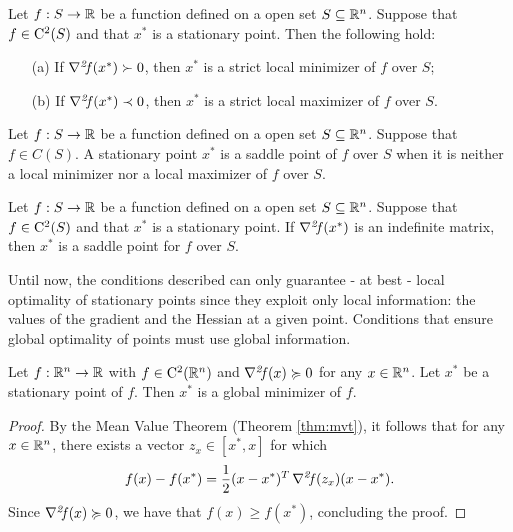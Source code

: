 \documentclass[10pt,a4paper]{article}
\begin{document}
\begin{theorem}\label{thm:suff_second_order_optimality}
	Let $f:S\to \mathbb{R}$ be a function defined on a open set $S\subseteq \mathbb{R}^n$. Suppose that $f\in\mathord{\mathrm{C^2}}(S)$ and that $x^*$ is a stationary point. Then the following hold:
	\begin{itemize}
		\item[(a)] If $\operatorname*{\mathit{\nabla^2 \!f}} (x^*)\succ 0$, then $x^*$ is a strict local minimizer of $f$ over $S$;
		\item[(b)] If  $\operatorname*{\mathit{\nabla^2 \!f}} (x^*)\prec 0$, then $x^*$ is a strict local maximizer of $f$ over $S$.
	\end{itemize}
\end{theorem}

\begin{definition}
	Let $f:S\to \mathbb{R}$ be a function defined on a open set $S\subseteq \mathbb{R}^n$. Suppose that $f\in C(S)$. A stationary point $x^*$ is a saddle point of $f$ over $S$ when it is neither a local minimizer nor a local maximizer of $f$ over $S$.
\end{definition}

\begin{theorem}
	Let $f:S\to \mathbb{R}$ be a function defined on a open set $S\subseteq \mathbb{R}^n$. Suppose that $f\in\mathord{\mathrm{C^2}}(S)$ and that $x^*$ is a stationary point. If $\operatorname*{\mathit{\nabla^2 \!f}}(x^*)$ is an indefinite matrix, then $x^*$ is a saddle point for $f$ over $S$.
\end{theorem}
Until now, the conditions described can only guarantee - at best - local optimality of stationary points since they exploit only local information: the values of the gradient and the Hessian at a given point. Conditions that ensure global optimality of points must use global information.

\begin{theorem}
	Let $f:\mathbb{R}^n\to \mathbb{R}$ with $f\in\mathord{\mathrm{C^2}}(\mathbb{R}^n)$ and $\operatorname*{\mathit{\nabla^2 \!f}} (x)\succcurlyeq0$ for any $x\in \mathbb{R}^n$. Let $x^*$ be a stationary point of $f$. Then $x^*$ is a global minimizer of $f$. 
\end{theorem}
\begin{proof}
	By the Mean Value Theorem (Theorem \ref{thm:mvt}), it follows that for any $x\in\mathbb{R}^n$, there exists a vector $z_x\in[x^*,x]$ for which 
	\begin{equation*}
		f(x) - f(x^*) = \frac{1}{2}(x-x^*)^T\operatorname*{\mathit{\nabla^2 \!f}} (z_x)(x-x^*).
	\end{equation*}
Since $\operatorname*{\mathit{\nabla^2 \!f}} (x) \succcurlyeq 0$, we have that $f(x)\geq f(x^*)$, concluding the proof.
\end{proof}
\end{document}
